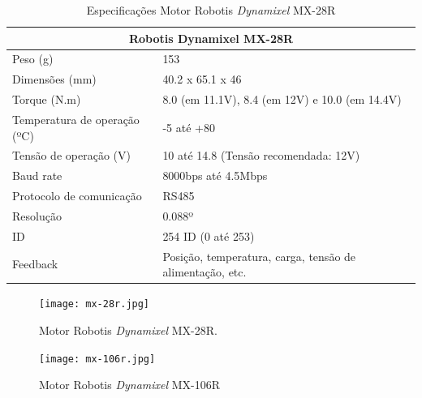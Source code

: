 \begin{table}[h!]
	\begin{tabular}{ll}
		
		\multicolumn{2}{c}{Robotis Dynamixel MX-28R}                                            \\ \hline
		Peso (g)                     & 153                                                      \\ \hline
		Dimensões (mm)               & 40.2 x 65.1 x 46                                         \\ \hline
		Torque (N.m)                 & 8.0 (em 11.1V), 8.4 (em 12V) e 10.0 (em 14.4V)           \\ \hline
		Temperatura de operação (ºC) & -5 até +80                                               \\ \hline
		Tensão de operação (V)       & 10 até 14.8 (Tensão recomendada: 12V)                    \\ \hline
		Baud rate                    & 8000bps até 4.5Mbps                                      \\ \hline
		Protocolo de comunicação     & RS485                                                    \\ \hline
		Resolução                    & 0.088º                                                   \\ \hline
		ID                           & 254 ID (0 até 253)                                       \\ \hline
		Feedback                     & Posição, temperatura, carga, tensão de alimentação, etc. \\ \hline
	\end{tabular}
	\caption{Especificações Motor Robotis\textit{ Dynamixel} MX-28R  }
\end{table}

 

\begin{figure}[h!]												
	\centering												
	\texttt{[image: mx-28r.jpg]}				
	\caption{Motor Robotis\textit{ Dynamixel} MX-28R.}		
	\label{img:mx28}
\end{figure}

\begin{figure}[h!]												
	\centering												
	\texttt{[image: mx-106r.jpg]}				
	\caption{Motor Robotis\textit{ Dynamixel} MX-106R}		
	\label{img:mx106}	
\end{figure}

